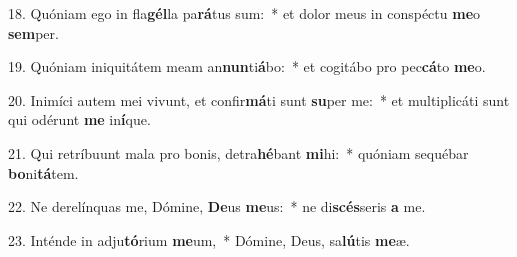 18. Quóniam ego in fla\textbf{gél}la pa\textbf{rá}tus sum:~*  et dolor meus in conspéctu \textbf{me}o \textbf{sem}per.\

19. Quóniam iniquitátem meam an\textbf{nun}ti\textbf{á}bo:~*  et cogitábo pro pec\textbf{cá}to \textbf{me}o.\

20. Inimíci autem mei vivunt, et confir\textbf{má}ti sunt \textbf{su}per me:~*  et multiplicáti sunt qui odérunt \textbf{me} in\textbf{í}que.\

21. Qui retríbuunt mala pro bonis, detra\textbf{hé}bant \textbf{mi}hi:~*  quóniam sequébar \textbf{bo}ni\textbf{tá}tem.\

22. Ne derelínquas me, Dómine, \textbf{De}us \textbf{me}us:~*  ne di\textbf{scés}seris \textbf{a} me.\

23. Inténde in adju\textbf{tó}rium \textbf{me}um,~*  Dómine, Deus, sa\textbf{lú}tis \textbf{me}æ.\


